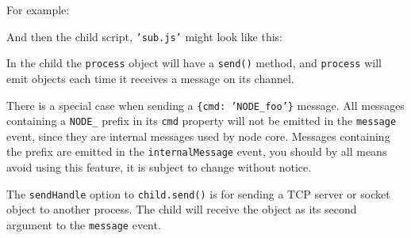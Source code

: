 For example:

\begin{Shaded}
\begin{Highlighting}[]
 \NormalTok{);}

 \NormalTok{);}

\NormalTok{(}\NormalTok{, }
  \NormalTok{(}
\NormalTok{\});}

\NormalTok{(\{ }\NormalTok{: } \NormalTok{\});}
\end{Highlighting}
\end{Shaded}

And then the child script, \texttt{'sub.js'} might look like this:

\begin{Shaded}
\begin{Highlighting}[]
\NormalTok{(}\NormalTok{, }
  \NormalTok{(}
\NormalTok{\});}

\NormalTok{(\{ }\NormalTok{: } \NormalTok{\});}
\end{Highlighting}
\end{Shaded}

In the child the \texttt{process} object will have a \texttt{send()}
method, and \texttt{process} will emit objects each time it receives a
message on its channel.

There is a special case when sending a \texttt{\{cmd: 'NODE\_foo'\}}
message. All messages containing a \texttt{NODE\_} prefix in its
\texttt{cmd} property will not be emitted in the \texttt{message} event,
since they are internal messages used by node core. Messages containing
the prefix are emitted in the \texttt{internalMessage} event, you should
by all means avoid using this feature, it is subject to change without
notice.

The \texttt{sendHandle} option to \texttt{child.send()} is for sending a
TCP server or socket object to another process. The child will receive
the object as its second argument to the \texttt{message} event.

